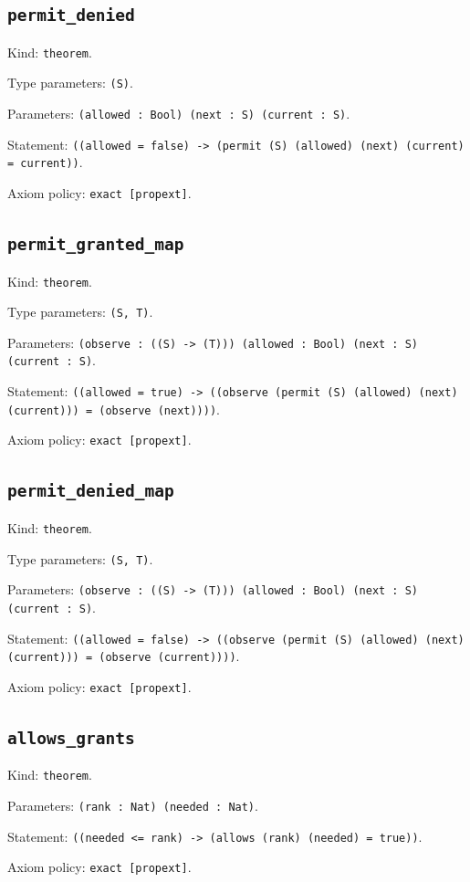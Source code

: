 \documentclass[11pt]{article}
\begin{document}
\subsection*{\texttt{permit\_denied}}
\noindent Kind: \texttt{theorem}.\par
\noindent Type parameters: \texttt{(S)}.\par
\noindent Parameters: \texttt{(allowed : Bool) (next : S) (current : S)}.\par
\noindent Statement: \texttt{((allowed = false) -> (permit (S) (allowed) (next) (current) = current))}.\par
\noindent Axiom policy: \texttt{exact [propext]}.\par
\subsection*{\texttt{permit\_granted\_map}}
\noindent Kind: \texttt{theorem}.\par
\noindent Type parameters: \texttt{(S, T)}.\par
\noindent Parameters: \texttt{(observe : ((S) -> (T))) (allowed : Bool) (next : S) (current : S)}.\par
\noindent Statement: \texttt{((allowed = true) -> ((observe (permit (S) (allowed) (next) (current))) = (observe (next))))}.\par
\noindent Axiom policy: \texttt{exact [propext]}.\par
\subsection*{\texttt{permit\_denied\_map}}
\noindent Kind: \texttt{theorem}.\par
\noindent Type parameters: \texttt{(S, T)}.\par
\noindent Parameters: \texttt{(observe : ((S) -> (T))) (allowed : Bool) (next : S) (current : S)}.\par
\noindent Statement: \texttt{((allowed = false) -> ((observe (permit (S) (allowed) (next) (current))) = (observe (current))))}.\par
\noindent Axiom policy: \texttt{exact [propext]}.\par
\subsection*{\texttt{allows\_grants}}
\noindent Kind: \texttt{theorem}.\par
\noindent Parameters: \texttt{(rank : Nat) (needed : Nat)}.\par
\noindent Statement: \texttt{((needed <= rank) -> (allows (rank) (needed) = true))}.\par
\noindent Axiom policy: \texttt{exact [propext]}.\par
\end{document}
